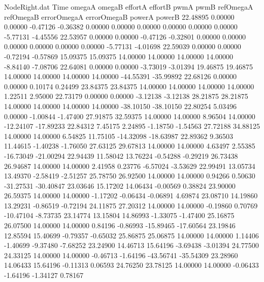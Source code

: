 \begin{filecontents}{NodeRight.dat}
Time omegaA omegaB effortA effortB pwmA pwmB refOmegaA refOmegaB errorOmegaA errorOmegaB powerA powerB
  22.48895    0.00000    0.00000    -0.47126   -0.36382    0.00000    0.00000    0.00000    0.00000    0.00000    0.00000   -5.77131   -4.45556
  22.53957    0.00000    0.00000    -0.47126   -0.32801    0.00000    0.00000    0.00000    0.00000    0.00000    0.00000   -5.77131   -4.01698
  22.59039    0.00000    0.00000    -0.72194   -0.57869   15.09375   15.09375   14.00000   14.00000   14.00000   14.00000   -8.84140   -7.08706
  22.64081    0.00000    0.00000    -3.73019   -3.01394   19.46875   19.46875   14.00000   14.00000   14.00000   14.00000  -44.55391  -35.99892
  22.68126    0.00000    0.00000     0.10174    0.24499   23.84375   23.84375   14.00000   14.00000   14.00000   14.00000    1.22511    2.95000
  22.73179    0.00000    0.00000    -3.12138   -3.12138   28.21875   28.21875   14.00000   14.00000   14.00000   14.00000  -38.10150  -38.10150
  22.80254    5.03496    0.00000    -1.00844   -1.47400   27.91875   32.59375   14.00000   14.00000    8.96504   14.00000  -12.24107  -17.89233
  22.84312    7.45175    2.24895    -1.18750   -1.54563   27.72188   34.88125   14.00000   14.00000    6.54825   11.75105  -14.32098  -18.63987
  22.89362    9.36503   11.44615    -1.40238   -1.76050   27.63125   29.67813   14.00000   14.00000    4.63497    2.55385  -16.73049  -21.00294
  22.94439   11.58042   13.76224    -0.54288   -0.29219   26.73438   26.94687   14.00000   14.00000    2.41958    0.23776   -6.57024   -3.53629
  22.99491   13.05734   13.49370    -2.58419   -2.51257   25.78750   26.92500   14.00000   14.00000    0.94266    0.50630  -31.27531  -30.40847
  23.03646   15.17202   14.06434    -0.00569    0.38824   23.90000   26.59375   14.00000   14.00000   -1.17202   -0.06434   -0.06891    4.69874
  23.08710   14.19860   13.29231    -0.86519   -0.72194   24.11875   27.20312   14.00000   14.00000   -0.19860    0.70769  -10.47104   -8.73735
  23.14774   13.15804   14.86993    -1.33075   -1.47400   25.16875   26.07500   14.00000   14.00000    0.84196   -0.86993  -15.89465  -17.60564
  23.19846   12.85594   15.40699    -0.79357   -0.65032   25.86875   25.06875   14.00000   14.00000    1.14406   -1.40699   -9.37480   -7.68252
  23.24900   14.46713   15.64196    -3.69438   -3.01394   24.77500   24.33125   14.00000   14.00000   -0.46713   -1.64196  -43.56741  -35.54309
  23.28960   14.06433   15.64196    -0.11313    0.06593   24.76250   23.78125   14.00000   14.00000   -0.06433   -1.64196   -1.34127    0.78167

\end{filecontents}
